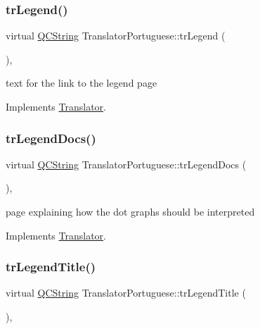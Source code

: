 \subsubsection{\texorpdfstring{trLegend()}{trLegend()}}
{\footnotesize\ttfamily virtual \mbox{\hyperlink{class_q_c_string}{Q\+C\+String}} Translator\+Portuguese\+::tr\+Legend (\begin{DoxyParamCaption}{ }\end{DoxyParamCaption})\hspace{0.3cm}{\ttfamily [inline]}, {\ttfamily [virtual]}}

text for the link to the legend page 

Implements \mbox{\hyperlink{class_translator}{Translator}}.

\mbox{\label{class_translator_portuguese_a8a5badb531a9d6a88861de122587d254}} 
\subsubsection{\texorpdfstring{trLegendDocs()}{trLegendDocs()}}
{\footnotesize\ttfamily virtual \mbox{\hyperlink{class_q_c_string}{Q\+C\+String}} Translator\+Portuguese\+::tr\+Legend\+Docs (\begin{DoxyParamCaption}{ }\end{DoxyParamCaption})\hspace{0.3cm}{\ttfamily [inline]}, {\ttfamily [virtual]}}

page explaining how the dot graph\textquotesingle{}s should be interpreted 

Implements \mbox{\hyperlink{class_translator}{Translator}}.

\mbox{\label{class_translator_portuguese_aca84c936f331401ecbe3393039706323}} 
\subsubsection{\texorpdfstring{trLegendTitle()}{trLegendTitle()}}
{\footnotesize\ttfamily virtual \mbox{\hyperlink{class_q_c_string}{Q\+C\+String}} Translator\+Portuguese\+::tr\+Legend\+Title (\begin{DoxyParamCaption}{ }\end{DoxyParamCaption})\hspace{0.3cm}{\ttfamily [inline]}, {\ttfamily [virtual]}}

